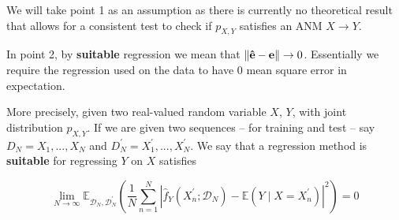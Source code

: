 We will take point 1 as an assumption as there is currently no theoretical result that allows for a consistent 
test to check if $p_{X, Y}$ satisfies an ANM $X \rightarrow Y$. 

In point 2, by \textbf{suitable} regression we mean that $\left\lVert\mathbf{\hat{e}} - \mathbf{e}\right\rVert \rightarrow 0$.
Essentially we require the regression used on the data to have 0 mean square error in expectation.

More precisely, given two real-valued random variable $X$, $Y$, with joint distribution $p_{X, Y}$. If 
we are given two sequences -- for training and test -- say $D_N = X_1, ..., X_N$ and 
$D_N^\prime = X^\prime_1, ..., X^\prime_N$. We say that a regression method is \textbf{suitable} for 
regressing $Y$ on $X$ satisfies

$$
\lim _{N \rightarrow \infty} \mathbb{E}_{\mathcal{D}_{N}, \mathcal{D}_{N}^{\prime}}\left(\frac{1}{N} 
\sum_{n=1}^{N}\left|\hat{f}_{Y}\left(X_{n}^{\prime} ; 
\mathcal{D}_{N}\right)-\mathbb{E}\left(Y \mid X=X_{n}^{\prime}\right)\right|^{2}\right)=0
$$



